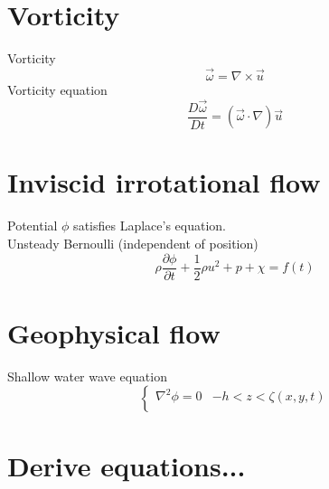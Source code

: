 \documentclass{article}
\theoremstyle{definition}
\theoremstyle{remark}
\theoremstyle{plain}
\theoremstyle{definition}
\begin{document}
\section{Vorticity}
Vorticity
\[\vec\omega=\nabla\times\vec u\]
Vorticity equation
\[\dfrac{D\vec\omega}{Dt}=(\vec\omega\cdot\nabla)\vec u\]
\section{Inviscid irrotational flow}
Potential $\phi$ satisfies Laplace's equation.\\
Unsteady Bernoulli (independent of position)
\[\rho\dfrac{\partial\phi}{\partial t}+\dfrac{1}{2}\rho u^2+p+\chi=f(t)\]

\section{Geophysical flow}
Shallow water wave equation
\[\begin{cases}
    \nabla^2\phi=0 & -h<z<\zeta(x,y,t)\\
    
\end{cases}\]
\section{Derive equations...}
\end{document}
